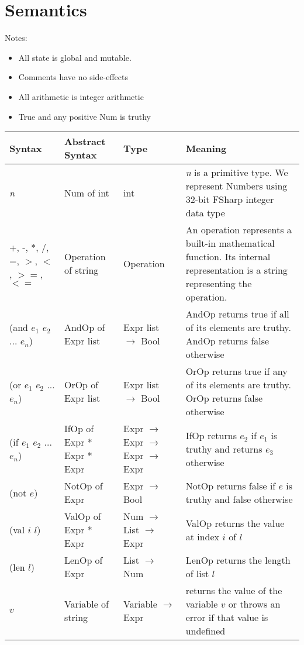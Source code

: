 \documentclass{article}
\begin{document}
\section{Semantics}

Notes:
\begin{itemize}
\item  All state is global and mutable.
\item Comments have no side-effects
\item All arithmetic is integer arithmetic
\item True and any positive Num is truthy
\end{itemize}

\begin{longtable}{|p{}|p{}|p{}|p{}|}
\hline
\textbf{Syntax} & \textbf{Abstract Syntax} & \textbf{Type} & \textbf{Meaning} \\
\hline\hline
\textit{n} & Num of int & int  & \textit{n} is a primitive type. We represent Numbers using 32-bit FSharp integer data type \\
\hline
+, -, *, /, =, $>$, $<$, $>=$, $<=$ & Operation of string & Operation  & An operation represents a built-in mathematical function. Its internal representation is a string representing the operation. \\
\hline
(and $e_{1}$ $e_{2}$ ... $e_{n}$) & AndOp of Expr list & Expr list $\rightarrow$ Bool  & AndOp returns true if all of its elements are truthy. AndOp returns false otherwise \\
\hline
(or $e_{1}$ $e_{2}$ ... $e_{n}$) & OrOp of Expr list & Expr list $\rightarrow$ Bool  & OrOp returns true if any of its elements are truthy. OrOp returns false otherwise \\
\hline
(if $e_{1}$ $e_{2}$ ... $e_{n}$) & IfOp of Expr * Expr * Expr & Expr $\rightarrow$ Expr $\rightarrow$ Expr $\rightarrow$ Expr & IfOp returns $e_{2}$ if $e_{1}$ is truthy and returns $e_{3}$ otherwise \\
\hline
(not $e$) & NotOp of Expr & Expr $\rightarrow$ Bool & NotOp returns false if $e$ is truthy and false otherwise \\
\hline
(val $i$ $l$) & ValOp of Expr * Expr & Num $\rightarrow$ List $\rightarrow$ Expr & ValOp returns the value at index $i$ of $l$ \\
\hline
(len $l$) & LenOp of Expr & List $\rightarrow$ Num & LenOp returns the length of list $l$ \\
\hline
$v$ & Variable of string & Variable $\rightarrow$ Expr &  returns the value of the variable $v$ or throws an error if that value is undefined \\

\end{longtable}
\end{document}
